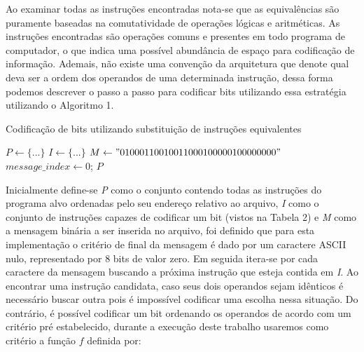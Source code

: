 Ao examinar todas as instruções encontradas nota-se que as equivalências são puramente baseadas na comutatividade de operações lógicas e aritméticas. As instruções encontradas são operações comuns e presentes em todo programa de computador, o que indica uma possível abundância de espaço para codificação de informação. Ademais, não existe uma convenção da arquitetura que denote qual deva ser a ordem dos operandos de uma determinada instrução, dessa forma podemos descrever o passo a passo para codificar bits utilizando essa estratégia utilizando o Algoritmo 1.

\begin{algorithm}
    \caption{Codificação de bits utilizando substituição de instruções equivalentes}\label{alg:one}
    $P \gets \{...\}$\;
    \BlankLine
    $I \gets \{...\}$\;
    \BlankLine
    $M \gets "01000110010011000100000100000000"$\;
    \BlankLine
    $message\_index \gets 0$;
    \BlankLine
\Return $P$\;
\end{algorithm}

Inicialmente define-se \textit{P} como o conjunto contendo todas as instruções do programa alvo ordenadas pelo seu endereço relativo ao arquivo, \textit{I} como o conjunto de instruções capazes de codificar um bit (vistos na Tabela 2) e \textit{M} como a mensagem binária a ser inserida no arquivo, foi definido que para esta implementação o critério de final da mensagem é dado por um caractere ASCII nulo, representado por 8 bits de valor zero. Em seguida itera-se por cada caractere da mensagem buscando a próxima instrução que esteja contida em \textit{I}. Ao encontrar uma instrução candidata, caso seus dois operandos sejam idênticos é necessário buscar outra pois é impossível codificar uma escolha nessa situação. Do contrário, é possível codificar um bit ordenando os operandos de acordo com um critério pré estabelecido, durante a execução deste trabalho usaremos como critério a função $\mathit{f}$ definida por:

